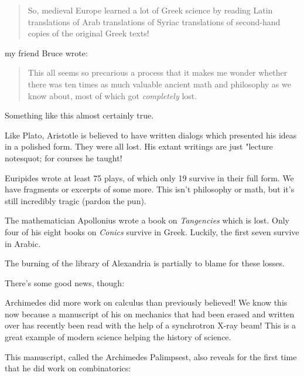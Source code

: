 \documentclass{article}
\renewcommand{\texttt}[1]{%
  \begingroup
  \ttfamily
  \begingroup\lccode`~=`/\lowercase{\endgroup\def~}{/\discretionary{}{}{}}%
  \begingroup\lccode`~=`[\lowercase{\endgroup\def~}{[\discretionary{}{}{}}%
  \begingroup\lccode`~=`.\lowercase{\endgroup\def~}{.\discretionary{}{}{}}%
  \catcode`/=\active\catcode`[=\active\catcode`.=\active
  \scantokens{#1\noexpand}%
  \endgroup
}
\begin{document}
\begin{quote}
So, medieval Europe learned a lot of Greek science by reading Latin
translations of Arab translations of Syriac translations of second-hand
copies of the original Greek texts!
\end{quote}

my friend Bruce wrote:

\begin{quote}
This all seems so precarious a process that it makes me wonder whether
there was ten times as much valuable ancient math and philosophy as we
know about, most of which got \emph{completely} lost.
\end{quote}

Something like this almost certainly true.

Like Plato, Aristotle is believed to have written dialogs which
presented his ideas in a polished form. They were all lost. His extant
writings are just "lecture notesquot; for courses he taught!

Euripides wrote at least 75 plays, of which only 19 survive in their
full form. We have fragments or excerpts of some more. This isn't
philosophy or math, but it's still incredibly tragic (pardon the pun).

The mathematician Apollonius wrote a book on \emph{Tangencies} which is
lost. Only four of his eight books on \emph{Conics} survive in Greek.
Luckily, the first seven survive in Arabic.

The burning of the library of Alexandria is partially to blame for these
losses.

There's some good news, though:

Archimedes did more work on calculus than previously believed! We know
this now because a manuscript of his on mechanics that had been erased
and written over has recently been read with the help of a synchrotron
X-ray beam! This is a great example of modern science helping the
history of science.

This manuscript, called the Archimedes Palimpsest, also reveals for the
first time that he did work on combinatorics:

\end{document}
